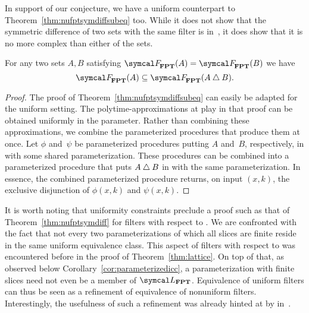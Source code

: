In support of our conjecture, we have a uniform counterpart to Theorem~\ref{thm:nufptsymdiffsubeq} too.
While it does not show that the symmetric difference of two sets with the same filter is in~, it does show that it is no more complex than either of the sets.
\begin{theorem}
  For any two sets $A, B$ satisfying $\calF_\cl{FPT}(A) = \calF_\cl{FPT}(B)$ we have
  \begin{equation*}
    \calF_\cl{FPT}(A) \subseteq \calF_\cl{FPT}(A \symdiff B).
  \end{equation*}
\end{theorem}
\begin{proof}
  The proof of Theorem~\ref{thm:nufptsymdiffsubeq} can easily be adapted for the uniform setting.
  The polytime-approximations at play in that proof can be obtained uniformly in the parameter.
  Rather than combining these approximations, we combine the parameterized procedures that produce them at once.
  Let $\phi$ and~$\psi$ be parameterized procedures putting $A$ and~$B$, respectively, in  with some shared parameterization.
  These procedures can be combined into a parameterized procedure that puts $A \bigtriangleup B$ in  with the same parameterization.
  In essence, the combined parameterized procedure returns, on input $(x, k)$, the exclusive disjunction of $\phi(x, k)$ and $\psi(x, k)$.
\end{proof}

It is worth noting that uniformity constraints preclude a proof such as that of Theorem~\ref{thm:nufptsymdiff} for filters with respect to .
We are confronted with the fact that not every two parameterizations of which all slices are finite reside in the same uniform equivalence class.
This aspect of filters with respect to  was encountered before in the proof of Theorem~\ref{thm:lattice}.
On top of that, as observed below Corollary~\ref{cor:parameterizedicc}, a parameterization with finite slices need not even be a member of $\calL_\cl{FPT}$.
Equivalence of uniform filters can thus be seen as a refinement of equivalence of nonuniform filters.
Interestingly, the usefulness of such a refinement was already hinted at by \textcite{orponen1986classification} in~\citeyear{orponen1986classification}.

